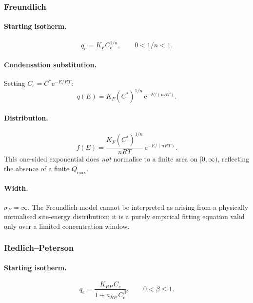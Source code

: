 \documentclass[journal=aamick,manuscript=article]{achemso}
\begin{document}
\subsubsection{Freundlich}

\paragraph{Starting isotherm.}
\begin{equation}
	q_e = K_F C_e^{1/n}, \qquad 0 < 1/n < 1.
\end{equation}

\paragraph{Condensation substitution.}
Setting $C_e = C^{\ast}\mathrm{e}^{-E/RT}$:
\begin{equation}
	q(E) = K_F(C^{\ast})^{1/n}\,\mathrm{e}^{-E/(nRT)}.
\end{equation}

\paragraph{Distribution.}
\begin{equation}
	f(E) = \frac{K_F(C^{\ast})^{1/n}}{nRT}\,\mathrm{e}^{-E/(nRT)}.
	\label{eq:si_fE_freundlich}
\end{equation}
This one-sided exponential does \emph{not} normalise to a finite area on
$[0,\infty)$, reflecting the absence of a finite $Q_{\max}$.

\paragraph{Width.}
$\sigma_E = \infty$. The Freundlich model cannot be interpreted as arising from
a physically normalised site-energy distribution; it is a purely empirical
fitting equation valid only over a limited concentration window.

\subsubsection{Redlich--Peterson}

\paragraph{Starting isotherm.}
\begin{equation}
	q_e = \frac{K_{RP}\,C_e}{1 + a_{RP}\,C_e^{\beta}},
	\qquad 0 < \beta \leq 1.
\end{equation}
\end{document}

